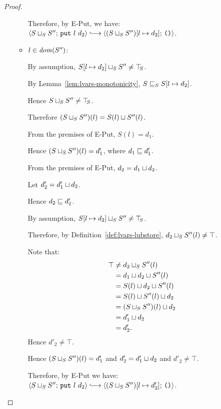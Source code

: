 \begin{proof}
\begin{itemize}
\begin{itemize}
          Therefore, by {\sc E-Put}, we have:
          $\config{\lubstore{S}{S''}}{\putexp{l}{d_2}} \parstepsto
          \config{\extSRaw{(\lubstore{S}{S''})}{l}{d_2}}{\unit}$.

        \item $l \in \mathit{dom}(S'')$:

          By assumption, $S[l \mapsto d_2] \sqcup_{S} S'' \neq
          \top\hspace{-0.85mm}_{S}$.

          By Lemma~\ref{lem:lvars-monotonicity},
          $S \sqsubseteq_S S[l \mapsto d_2]$.

          Hence $S \sqcup_{S} S'' \neq \top\hspace{-0.85mm}_{S}$.

          Therefore $(S \sqcup_{S} S'')(l) = S(l) \sqcup S''(l)$.

          From the premises of {\sc E-Put}, $S(l) = d_1$.
          
          Hence $(S \sqcup_{S} S'')(l) = d'_1$, where $d_1 \sqsubseteq
          d'_1$.

          From the premises of {\sc E-Put}, $d_2 =
          d_1 \sqcup d_2$.

          Let $d'_2 = d'_1 \sqcup d_2$.

          Hence $d_2 \sqsubseteq d'_2$.

          By assumption, $S[l \mapsto d_2] \sqcup_{S} S'' \neq
          \top\hspace{-0.85mm}_{S}$.

          Therefore, by Definition~\ref{def:lvars-lubstore},
          $d_2 \sqcup_{S} S''(l) \neq \top$.

          Note that:
          \begin{align*}
            \top &\neq d_2 \sqcup_{S} S''(l) \\ &=
            d_1 \sqcup d_2 \sqcup S''(l) \\ &=
            S(l) \sqcup d_2 \sqcup S''(l) \\ &=
            S(l) \sqcup S''(l) \sqcup d_2 \\ &=
            (S \sqcup_{S} S'')(l) \sqcup d_2 \\ &=
            d'_1 \sqcup d_2 \\ &= d'_2. \\
          \end{align*}
          Hence $d'_2 \neq \top$.

          Hence $(S \sqcup_{S} S'')(l) = d'_1$ and $d'_2 =
          d'_1 \sqcup d_2$ and $d'_2 \neq \top$.

          Therefore, by {\sc E-Put} we have:
          $\config{\lubstore{S}{S''}}{\putexp{l}{d_2}} \parstepsto
          \config{\extSRaw{(\lubstore{S}{S''})}{l}{d'_2}}{\unit}$.


\end{itemize}
\end{itemize}
\end{proof}
